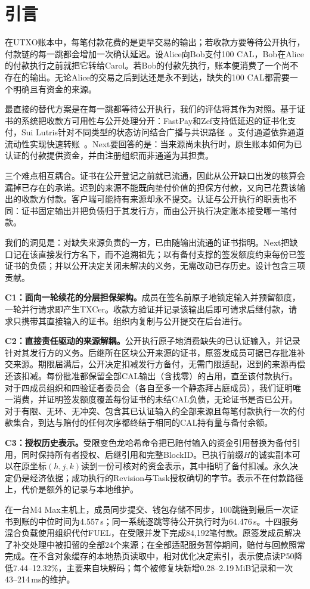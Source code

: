\section{引言}
\label{sec:introduction}

在UTXO账本中，每笔付款花费的是更早交易的输出；若收款方要等待公开执行，付款链的每一跳都会增加一次确认延迟。设Alice向Bob支付100 CAL，Bob在Alice的付款执行之前就把它转给Carol。若Bob的付款先执行，账本便消费了一个尚不存在的输出。无论Alice的交易之后到达还是永不到达，缺失的100 CAL都需要一个明确且有资金的来源。

最直接的替代方案是在每一跳都等待公开执行，我们的评估将其作为对照。基于证书的系统把收款方可用性与公开处理分开：FastPay和Zef支持低延迟的证书化支付，Sui Lutris针对不同类型的状态访问结合广播与共识路径~\cite{fastpay,zef,lutris}。支付通道依靠通道流动性实现快速转账~\cite{blitz,donner}。Next要回答的是：当来源尚未执行时，原生账本如何为已认证的付款提供资金，并由注册组织而非通道为其担责。

三个难点相互耦合。证书在公开登记之前就已流通，因此从公开缺口出发的核算会漏掉已存在的承诺。迟到的来源不能既向垫付价值的担保方付款，又向已花费该输出的收款方付款。客户端可能持有来源却永不提交。认证与公开执行的职责也不同：证书固定输出并把负债归于其发行方，而由公开执行决定账本接受哪一笔付款。

我们的洞见是：对缺失来源负责的一方，已由随输出流通的证书指明。Next把缺口记在该直接发行方名下，而不追溯祖先；以有备付支撑的签发额度约束每份已签证书的负债；并以公开决定关闭未解决的义务，无需改动已存历史。设计包含三项贡献。

\noindent\textbf{C1：面向一轮续花的分层担保架构。}成员在签名前原子地锁定输入并预留额度，一轮并行请求即产生TXCer。收款方验证并记录该输出后即可请求后继付款，请求只携带其直接输入的证书。组织内复制与公开提交在后台进行。

\noindent\textbf{C2：直接责任驱动的来源解耦。}公开执行原子地消费缺失的已认证输入，并记录针对其发行方的义务。后继所在区块公开来源的证书，原签发成员可据已存批准补交来源。期限届满后，公开决定扣减发行方备付，无需门限适配，迟到的来源再偿还该扣减。每份批准都保留全部CAL输出（含找零）的占用，直至该付款执行。对于四成员组织和四验证者委员会（各自至多一个静态拜占庭成员），我们证明唯一消费，并证明签发额度覆盖每份证书的未结CAL负债，无论证书是否已公开。对于有限、无环、无冲突、包含其已认证输入的全部来源且每笔付款执行一次的付款集合，到达与赔付的任何次序都终结于相同的CAL持有量与备付余额。

\noindent\textbf{C3：授权历史表示。}受限变色龙哈希命令把已赔付输入的资金引用替换为备付引用，同时保持所有者授权、后继引用和完整BlockID。已执行前缀$H$的诚实副本可以在原坐标$(h,j,k)$读到一份可核对的资金表示，其中指明了备付扣减。永久决定仍是经济依据；成功执行的Revision与Task授权确切的字节。表示不在付款路径上，代价是额外的记录与本地维护。

在一台M4 Max主机上，成员同步提交、钱包存储不同步，100跳链到最后一次证书到账的中位时间为4.557\,s；同一系统逐跳等待公开执行时为64.476\,s。十四服务混合负载使用组织代付FUEL，在受限并发下完成84,192笔付款。原签发成员解决了补交处理中被扣留的全部24个来源；在全部适配服务暂停期间，赔付与回款照常完成。在不含对象缓存的本地热页读取中，相对优化决定索引，表示使点读P50降低7.44--12.32\%，主要来自块解码；每个被修复块新增0.28--2.19\,MiB记录和一次43--214\,ms的维护。